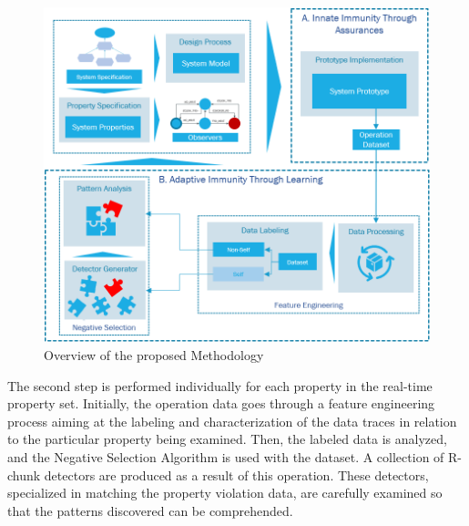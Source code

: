 

\begin{figure}[!h]
	\centering
	\includegraphics[width=0.999\textwidth, keepaspectratio]{img/overview_framework4.png}
	\caption{Overview of the proposed Methodology}
	\label{fig:FrameworkOverview}
\end{figure}

The second step is performed individually for each property in the real-time property set. Initially, the operation data goes through a feature engineering process aiming at the labeling and characterization of the data traces in relation to the particular property being examined. Then, the labeled data is analyzed, and the Negative Selection Algorithm is used with the dataset. A collection of R-chunk detectors are produced as a result of this operation. These detectors, specialized in matching the property violation data, are carefully examined so that the patterns discovered can be comprehended. 

